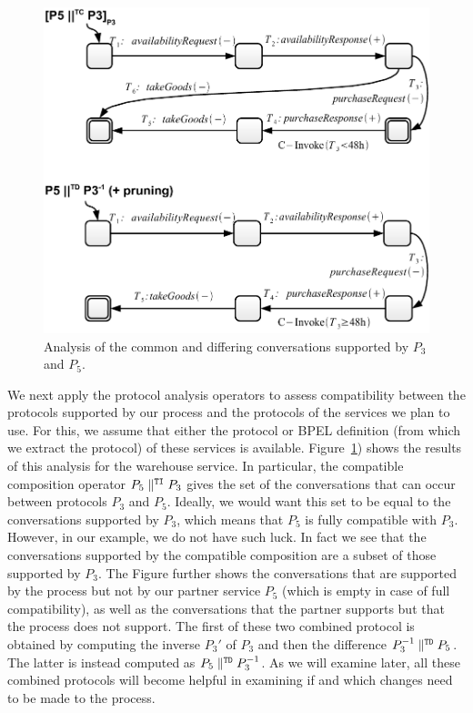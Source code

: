 \begin{figure}[tbhp]
    \centering
    \includegraphics[width=\textwidth]{content/sample-usecase/bpel-warehouse-protocol-diff}
    \caption{Analysis of the common and differing conversations supported by $P_3$ and $P_5$.}
    \label{fig:bpel-warehouse-diff}
\end{figure}

We next apply the protocol analysis operators to assess compatibility between the protocols supported by our process and the protocols of the services we plan to use. For this, we assume that either the protocol or BPEL definition (from which we extract the protocol) of these services is available.
Figure~\ref{fig:bpel-warehouse-diff}) shows the results of this analysis for the warehouse service. In particular,
the compatible composition operator $P_5 \parallel^{\mathtt{TI}} P_3$ gives the set of the conversations that can occur between protocols $P_3$ and $P_5$.
Ideally, we would want this set to be equal to the conversations supported by $P_3$, which means that $P_5$ is fully compatible with $P_3$.\\

However, in our example, we do not have such luck. In fact we see that the conversations supported by the compatible composition are a subset of those supported by $P_3$.
The Figure further shows the conversations that are supported by the process but not by our partner service $P_5$ (which is empty in case of full compatibility), as well as the conversations that the partner supports but that the process does not support. The first of these two combined protocol is obtained by computing the inverse $P_3'$ of $P_3$ and then the difference $P_3^{-1} \parallel^{\mathtt{TD}} P_5$. The latter is instead computed as  $P_5 \parallel^{\mathtt{TD}} P_3^{-1}$. As we will examine later, all these combined protocols will become helpful in examining if and which changes need to be made to the process.\\

